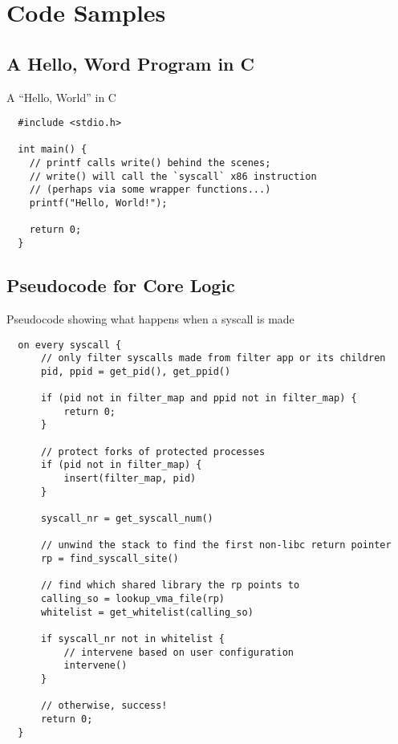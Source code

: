 \appendix
\section{Code Samples}

\subsection{A Hello, Word Program in C}

\begin{listing}[H]
  \caption{A ``Hello, World'' in C}\label{lst:hello-world}
  \begin{verbatim}
  #include <stdio.h>

  int main() {
    // printf calls write() behind the scenes;
    // write() will call the `syscall` x86 instruction 
    // (perhaps via some wrapper functions...)
    printf("Hello, World!");

    return 0;
  }
 \end{verbatim}
\end{listing}



\subsection{Pseudocode for \af Core Logic}\label{subsec:apx-af-pseudocode}

\begin{listing}[H]
  \caption{Pseudocode showing what happens when a syscall is made}\label{lst:syscall-filter}
  \begin{verbatim}
  on every syscall {
      // only filter syscalls made from filter app or its children
      pid, ppid = get_pid(), get_ppid()

      if (pid not in filter_map and ppid not in filter_map) {
          return 0;
      }

      // protect forks of protected processes
      if (pid not in filter_map) {
          insert(filter_map, pid)
      }

      syscall_nr = get_syscall_num()

      // unwind the stack to find the first non-libc return pointer
      rp = find_syscall_site()

      // find which shared library the rp points to
      calling_so = lookup_vma_file(rp)
      whitelist = get_whitelist(calling_so)

      if syscall_nr not in whitelist {
          // intervene based on user configuration
          intervene()
      }

      // otherwise, success!
      return 0;
  }
  \end{verbatim}
\end{listing}

